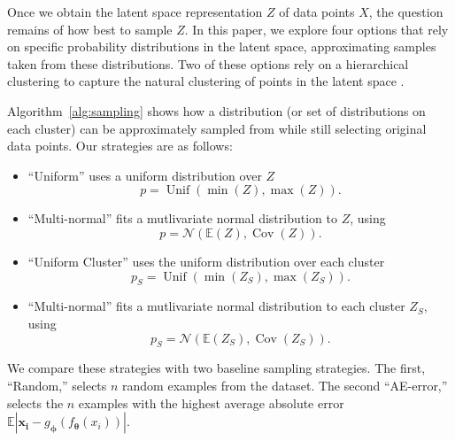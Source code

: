 \documentclass[a4paper]{article}
\def\vec#1{\ensuremath{\bm{{#1}}}}
\DeclareMathOperator{\unif}{Unif}
\DeclareMathOperator{\cov}{Cov}
\begin{document}
Once we obtain the latent space representation $Z$ of data points $X$, the
question remains of how best to sample $Z$. In this paper, we explore four
options that rely on specific probability distributions in the latent space,
approximating samples taken from these distributions. Two of these options rely
on a hierarchical clustering to capture the natural clustering of points in the
latent space \cite{johnson_hierarchical_1967}.

Algorithm~\ref{alg:sampling} shows how a distribution (or set of distributions
on each cluster) can be approximately sampled from while still selecting
original data points. Our strategies are as follows:
\begin{itemize}
\item ``Uniform'' uses a uniform distribution over $Z$
  \[p = \unif(\min(Z), \max(Z)).\]
\item ``Multi-normal'' fits a mutlivariate normal distribution to $Z$, using
  \[p = \mathcal{N}(\mathbb{E}(Z), \cov(Z)).\]
\item ``Uniform Cluster'' uses the uniform distribution over each cluster
  \[p_S = \unif(\min(Z_S), \max(Z_S)).\]
\item ``Multi-normal'' fits a mutlivariate normal distribution to each cluster
  $Z_S$, using \[p_S = \mathcal{N}(\mathbb{E}(Z_S), \cov(Z_S)).\]
\end{itemize}

We compare these strategies with two baseline sampling strategies. The first,
``Random,'' selects $n$ random examples from the dataset. The second
``AE-error,'' selects the $n$ examples with the highest average absolute error
$\mathbb{E}|\vec{x_i} - g_{\vec{\phi}}(f_{\vec{\theta}}(x_i))|$.
\end{document}
